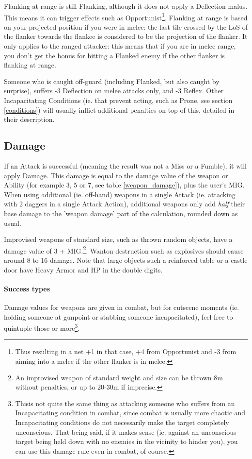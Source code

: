 Flanking at range is still Flanking, although it does not apply a Deflection malus. This means it can trigger effects such as Opportunist\footnote{Thus resulting in a net +1 in that case, +4 from Opportunist and -3 from aiming into a melee if the other flanker is in melee.}. Flanking at range is based on your projected position if you were in melee: the last tile crossed by the LoS of the flanker towards the flankee is considered to be the projection of the flanker. It only applies to the ranged attacker: this means that if you are in melee range, you don't get the bonus for hitting a Flanked enemy if the other flanker is flanking at range.

Someone who is caught off-guard (including Flanked, but also caught by surprise), suffers -3 Deflection on melee attacks only, and -3 Reflex. Other Incapacitating Conditions (ie. that prevent acting, such as Prone, see section \ref{conditions}) will usually inflict additional penalties on top of this, detailed in their description.


\subsection{Damage}

If an Attack is successful (meaning the result was not a Miss or a Fumble), it will apply Damage. This damage is equal to the damage value of the weapon or Ability (for example 3, 5 or 7, see table \ref{weapon_damage}), plus the user's MIG. When using additional (ie. off-hand) weapons in a single Attack (ie. attacking with 2 daggers in a single Attack Action), additional weapons only add \textit{half} their base damage to the 'weapon damage' part of the calculation, rounded down as usual. 

Improvised weapons of standard size, such as thrown random objects, have a damage value of 3 + MIG.\footnote{An improvised weapon of standard weight and size can be thrown 8m without penalties, or up to 20-30m if imprecise.}. Wanton destruction such as explosives should cause around 8 to 16 damage. Note that large objects such a reinforced table or a castle door have Heavy Armor and HP in the double digits.

\paragraph{Success types}

Damage values for weapons are given in combat, but for cutscene moments (ie. holding someone at gunpoint or stabbing someone incapacitated), feel free to quintuple those or more\footnote{Thisis not quite the same thing as attacking someone who suffers from an Incapacitating condition in combat, since combat is usually more chaotic and Incapacitating conditions do not necessarily make the target completely unconscious. That being said, if it makes sense (ie. against an unconscious target being held down with no enemies in the vicinity to hinder you), you can use this  damage rule even in combat, of course.}.

